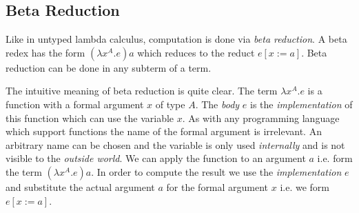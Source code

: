 \subsection{Beta Reduction}

Like in untyped lambda calculus, computation is done via \emph{beta reduction}.
A beta redex has the form $(\lambda x^A. e) a$ which reduces to the reduct
$e[x:=a]$. Beta reduction can be done in any subterm of a term.

The intuitive meaning of beta reduction is quite clear. The term $\lambda x^A.e$
is a function with a formal argument $x$ of type $A$. The \emph{body} $e$ is the
\emph{implementation} of this function which can use the variable $x$. As with
any programming language which support functions the name of the formal
argument is irrelevant. An arbitrary name can be chosen and the variable is only
used \emph{internally} and is not visible to the \emph{outside world}. We can
apply the function to an argument $a$ i.e. form the term $(\lambda x^A.e) a$. In
order to compute the result we use the \emph{implementation} $e$ and substitute
the actual argument $a$ for the formal argument $x$ i.e. we form $e[x:=a]$.


